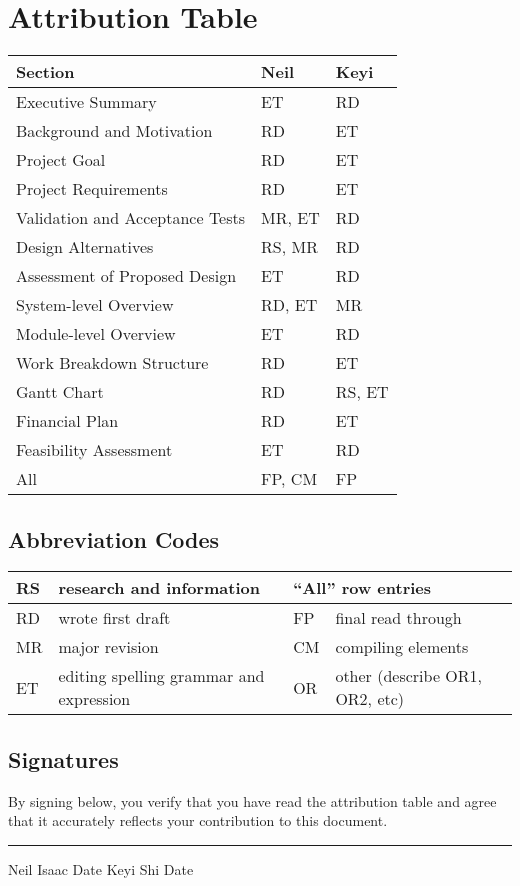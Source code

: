 \section{Attribution Table}

{\footnotesize
\begin{tabular}{|l|l|l|}
	\hline
	\textbf{Section} & \textbf{Neil} & \textbf{Keyi} \\
	\hline \hline
	Executive Summary & ET & RD \\
	\hline
	Background and Motivation & RD & ET \\
	Project Goal & RD & ET \\
	Project Requirements & RD & ET \\
	Validation and Acceptance Tests & MR, ET & RD \\
	\hline
	Design Alternatives & RS, MR & RD \\
	Assessment of Proposed Design & ET & RD \\
	System-level Overview & RD, ET & MR \\
	Module-level Overview & ET & RD \\
	\hline
	Work Breakdown Structure & RD & ET \\
	Gantt Chart & RD & RS, ET \\
	Financial Plan & RD & ET \\
	Feasibility Assessment & ET & RD \\
	\hline
	All & FP, CM & FP \\
	\hline
\end{tabular}
}

\subsection*{Abbreviation Codes}

{\footnotesize
\begin{tabular}[width=7in]{|l|l||l|l|}
	\hline
	RS & research and information & \multicolumn{2}{l|}{``All'' row entries} \\ \hline
	RD & wrote first draft & FP & final read through \\ \hline
	MR & major revision & CM & compiling elements \\ \hline
	ET & editing spelling grammar and expression & OR & other (describe OR1, OR2, etc) \\ \hline
\end{tabular}
}

\subsection*{Signatures}

By signing below, you verify that you have read the attribution table and agree that it accurately reflects your contribution to this document.

\vfill

\hrule
Neil Isaac \hspace{1in} Date \hspace{1in} Keyi Shi \hspace{1in} Date

